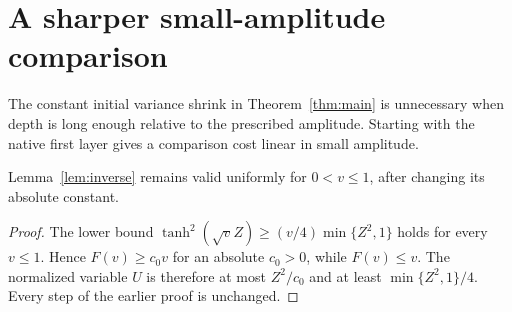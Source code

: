 \section{A sharper small-amplitude comparison}
\label{sec:sharp-amplitude}
The constant initial variance shrink in Theorem~\ref{thm:main} is unnecessary when depth is long enough relative to the prescribed amplitude. Starting with the native first layer gives a comparison cost linear in small amplitude.

\begin{lemma}
\label{lem:inverse-large}
Lemma~\ref{lem:inverse} remains valid uniformly for $0<v\le1$, after changing its absolute constant.
\end{lemma}
\begin{proof}
The lower bound $\tanh^2(\sqrt v Z)\ge(v/4)\min\{Z^2,1\}$ holds for every $v\le1$. Hence $F(v)\ge c_0v$ for an absolute $c_0>0$, while $F(v)\le v$. The normalized variable $U$ is therefore at most $Z^2/c_0$ and at least $\min\{Z^2,1\}/4$. Every step of the earlier proof is unchanged.
\end{proof}

